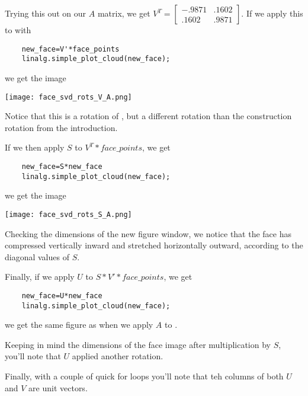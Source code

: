 \documentclass{ximera}
\begin{document}
\begin{problem}
\begin{feedback}
  Trying this out on our $A$ matrix, we get $V^T=\begin{bmatrix}
    -.9871 & .1602 \\ .1602 & .9871
  \end{bmatrix}$. If we apply this to \facepoints with

  \begin{verbatim}
    new_face=V'*face_points
    linalg.simple_plot_cloud(new_face);
  \end{verbatim}

  we get the image

    \begin{center}
      \texttt{[image: face\_svd\_rots\_V\_A.png]}
    \end{center}

  Notice that this is a rotation of \facepoints, but a different rotation than the construction rotation from the introduction.
  
  If we then apply $S$ to $V^T*face\_points$, we get 

  \begin{verbatim}
    new_face=S*new_face
    linalg.simple_plot_cloud(new_face);
  \end{verbatim}

  we get the image

    \begin{center}
      \texttt{[image: face\_svd\_rots\_S\_A.png]}
    \end{center}

  Checking the dimensions of the new figure window, we notice that the face has compressed vertically inward and stretched horizontally outward, according to the diagonal values of $S$.

  Finally, if we apply $U$ to $S*V'*face\_points$, we get 

  \begin{verbatim}
    new_face=U*new_face
    linalg.simple_plot_cloud(new_face);
  \end{verbatim}

  we get the same figure as when we apply $A$ to \facepoints. 

  Keeping in mind the dimensions of the face image after multiplication by $S$, you'll note that $U$ applied another rotation. 

  Finally, with a couple of quick for loops you'll note that teh columns of both $U$ and $V$ are unit vectors. 

\end{feedback}

\end{problem}
\end{document}

